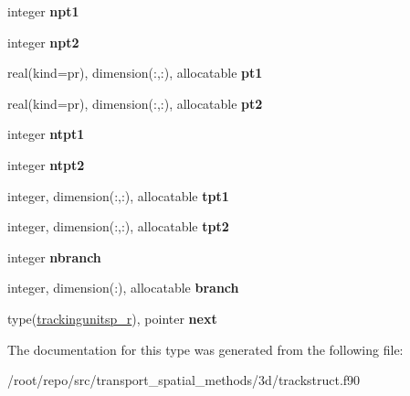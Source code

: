 \begin{DoxyCompactItemize}
integer {\bfseries npt1}
\item 
\mbox{\label{structtracking__data__structures_1_1trackingunitsp__r_a62bea582cc9a5d9dec850abc3b452fbe}} 
integer {\bfseries npt2}
\item 
\mbox{\label{structtracking__data__structures_1_1trackingunitsp__r_ac614c75b8fa2a81192247a44a2b584c6}} 
real(kind=pr), dimension(\+:,\+:), allocatable {\bfseries pt1}
\item 
\mbox{\label{structtracking__data__structures_1_1trackingunitsp__r_a00c9e7fc4488d6958a95972d296cc894}} 
real(kind=pr), dimension(\+:,\+:), allocatable {\bfseries pt2}
\item 
\mbox{\label{structtracking__data__structures_1_1trackingunitsp__r_a14fdecc3b9fc9435df875be0cb333fbf}} 
integer {\bfseries ntpt1}
\item 
\mbox{\label{structtracking__data__structures_1_1trackingunitsp__r_addca6922d607a25212231366455f182a}} 
integer {\bfseries ntpt2}
\item 
\mbox{\label{structtracking__data__structures_1_1trackingunitsp__r_a8ab324b5f7b70fa24e02a9ad0df7b8a2}} 
integer, dimension(\+:,\+:), allocatable {\bfseries tpt1}
\item 
\mbox{\label{structtracking__data__structures_1_1trackingunitsp__r_a48b98539d1463bca054ab2c835aa578e}} 
integer, dimension(\+:,\+:), allocatable {\bfseries tpt2}
\item 
\mbox{\label{structtracking__data__structures_1_1trackingunitsp__r_a5378c801096551d6d507eb04dd011a6c}} 
integer {\bfseries nbranch}
\item 
\mbox{\label{structtracking__data__structures_1_1trackingunitsp__r_a190f4625d2f13828b2f02ca184121c79}} 
integer, dimension(\+:), allocatable {\bfseries branch}
\item 
\mbox{\label{structtracking__data__structures_1_1trackingunitsp__r_a24d8fb2d7521637baa6381200f4fd753}} 
type(\hyperlink{structtracking__data__structures_1_1trackingunitsp__r}{trackingunitsp\+\_\+r}), pointer {\bfseries next}
\end{DoxyCompactItemize}


The documentation for this type was generated from the following file\+:\begin{DoxyCompactItemize}
\item 
/root/repo/src/transport\+\_\+spatial\+\_\+methods/3d/trackstruct.\+f90\end{DoxyCompactItemize}
